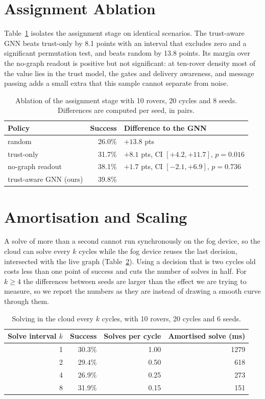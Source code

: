 \section{Assignment Ablation}

Table~\ref{tab:res:ablation} isolates the assignment stage on identical
scenarios. The trust-aware GNN beats trust-only by 8.1 points with an interval
that excludes zero and a significant permutation test, and beats random by
13.8 points. Its margin over the no-graph readout is positive but not
significant: at ten-rover density most of the value lies in the trust model,
the gates and delivery awareness, and message passing adds a small extra that
this sample cannot separate from noise.

\begin{table}[htbp]
\centering
\caption{Ablation of the assignment stage with 10 rovers, 20 cycles and 8
seeds. Differences are computed per seed, in pairs.}
\label{tab:res:ablation}
\small
\begin{tabular}{@{}l r l@{}}
\toprule
Policy & Success & Difference to the GNN \\
\midrule
random & 26.0\% & $+13.8$ pts \\
trust-only & 31.7\% & $+8.1$ pts, CI $[+4.2,+11.7]$, $p=0.016$ \\
no-graph readout & 38.1\% & $+1.7$ pts, CI $[-2.1,+6.9]$, $p=0.736$ \\
trust-aware GNN (ours) & 39.8\% & \\
\bottomrule
\end{tabular}
\end{table}

\section{Amortisation and Scaling}
\label{sec:res:staleness}

A solve of more than a second cannot run synchronously on the fog device, so
the cloud can solve every $k$ cycles while the fog device reuses the last
decision, intersected with the live graph (Table~\ref{tab:res:staleness}).
Using a decision that is two cycles old costs less than one point of success
and cuts the number of solves in half. For $k\ge4$ the differences between
seeds are larger than the effect we are trying to measure, so we report the
numbers as they are instead of drawing a smooth curve through them.

\begin{table}[htbp]
\centering
\caption{Solving in the cloud every $k$ cycles, with 10 rovers, 20 cycles and 6 seeds.}
\label{tab:res:staleness}
\small
\begin{tabular}{@{}r r r r@{}}
\toprule
Solve interval $k$ & Success & Solves per cycle & Amortised solve (ms) \\
\midrule
1 & 30.3\% & 1.00 & 1279 \\
2 & 29.4\% & 0.50 & 618 \\
4 & 26.9\% & 0.25 & 273 \\
8 & 31.9\% & 0.15 & 151 \\
\bottomrule
\end{tabular}
\end{table}

